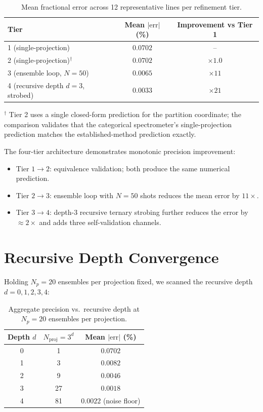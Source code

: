 \documentclass[twocolumn,11pt,a4paper]{article}
\theoremstyle{thmstyle}
\theoremstyle{axiomstyle}
\theoremstyle{definition}
\theoremstyle{remark}
\begin{document}
\begin{table}[H]
\centering
\caption{Mean fractional error across 12 representative lines per refinement tier.}
\label{tab:tier_summary}
\begin{tabular}{lcc}
\toprule
Tier & Mean $|\mathrm{err}|$ (\%) & Improvement vs Tier 1\\
\midrule
1 (single-projection) & $0.0702$ & --\\
2 (single-projection)$^{\dagger}$ & $0.0702$ & $\times 1.0$\\
3 (ensemble loop, $N=50$) & $0.0065$ & $\times 11$\\
4 (recursive depth $d=3$, strobed) & $0.0033$ & $\times 21$\\
\bottomrule
\end{tabular}
\end{table}
\noindent$^{\dagger}$ Tier 2 uses a single closed-form prediction for the partition coordinate; the comparison validates that the categorical spectrometer's single-projection prediction matches the established-method prediction exactly.

The four-tier architecture demonstrates monotonic precision improvement:
\begin{itemize}[nosep]
\item Tier $1\to 2$: equivalence validation; both produce the same numerical prediction.
\item Tier $2\to 3$: ensemble loop with $N=50$ shots reduces the mean error by $11\times$.
\item Tier $3\to 4$: depth-3 recursive ternary strobing further reduces the error by $\approx 2\times$ and adds three self-validation channels.
\end{itemize}

\section{Recursive Depth Convergence}
\label{sec:depth_results}

Holding $N_{p}=20$ ensembles per projection fixed, we scanned the recursive depth $d=0,1,2,3,4$:

\begin{table}[H]
\centering
\caption{Aggregate precision vs.\ recursive depth at $N_{p}=20$ ensembles per projection.}
\label{tab:depth}
\begin{tabular}{ccc}
\toprule
Depth $d$ & $N_{\mathrm{proj}}=3^{d}$ & Mean $|\mathrm{err}|$ (\%)\\
\midrule
0 & 1 & $0.0702$\\
1 & 3 & $0.0082$\\
2 & 9 & $0.0046$\\
3 & 27 & $0.0018$\\
4 & 81 & $0.0022$ (noise floor)\\
\bottomrule
\end{tabular}
\end{table}
\end{document}
